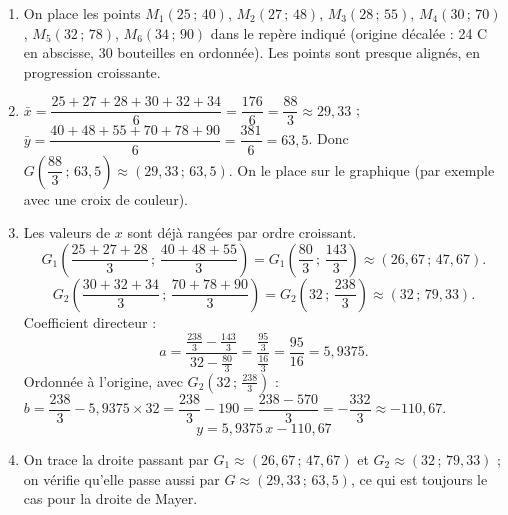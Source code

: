 \documentclass[11pt]{article}
\begin{document}
\begin{corrige}
\begin{enumerate}
\item On place les points $M_1(25\,;\,40)$, $M_2(27\,;\,48)$, $M_3(28\,;\,55)$, $M_4(30\,;\,70)$, $M_5(32\,;\,78)$, $M_6(34\,;\,90)$ dans le repère indiqué (origine décalée : 24 \textdegree C en abscisse, 30 bouteilles en ordonnée). Les points sont presque alignés, en progression croissante.
\item $\bar{x}=\dfrac{25+27+28+30+32+34}{6}=\dfrac{176}{6}=\dfrac{88}{3}\approx 29{,}33$ ;
$\bar{y}=\dfrac{40+48+55+70+78+90}{6}=\dfrac{381}{6}=63{,}5$.
Donc $G\left(\dfrac{88}{3}\,;\,63{,}5\right)\approx(29{,}33\,;\,63{,}5)$. On le place sur le graphique (par exemple avec une croix de couleur).
\item Les valeurs de $x$ sont déjà rangées par ordre croissant.
\[ G_1\left(\frac{25+27+28}{3}\,;\,\frac{40+48+55}{3}\right)=G_1\left(\frac{80}{3}\,;\,\frac{143}{3}\right)\approx(26{,}67\,;\,47{,}67). \]
\[ G_2\left(\frac{30+32+34}{3}\,;\,\frac{70+78+90}{3}\right)=G_2\left(32\,;\,\frac{238}{3}\right)\approx(32\,;\,79{,}33). \]
Coefficient directeur :
\[ a=\frac{\frac{238}{3}-\frac{143}{3}}{32-\frac{80}{3}}=\frac{\frac{95}{3}}{\frac{16}{3}}=\frac{95}{16}=5{,}9375. \]
Ordonnée à l'origine, avec $G_2(32\,;\,\frac{238}{3})$ : $b=\dfrac{238}{3}-5{,}9375\times 32=\dfrac{238}{3}-190=\dfrac{238-570}{3}=-\dfrac{332}{3}\approx -110{,}67$.
\[ \boxed{y=5{,}9375\,x-110{,}67} \]
\item On trace la droite passant par $G_1\approx(26{,}67\,;\,47{,}67)$ et $G_2\approx(32\,;\,79{,}33)$ ; on vérifie qu'elle passe aussi par $G\approx(29{,}33\,;\,63{,}5)$, ce qui est toujours le cas pour la droite de Mayer.
\end{enumerate}
\end{corrige}
\end{document}
